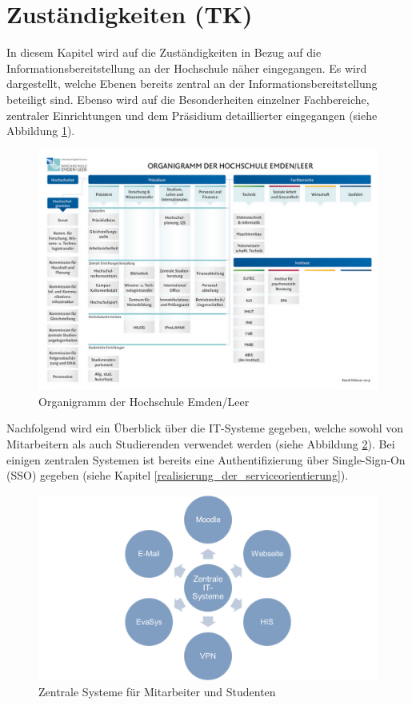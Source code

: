 \section{Zuständigkeiten (TK)}
\label{section_zustaendigkeiten}
In diesem Kapitel wird auf die Zuständigkeiten in Bezug auf die Informationsbereitstellung an der Hochschule näher eingegangen. Es wird dargestellt, welche Ebenen bereits zentral an der Informationsbereitstellung beteiligt sind. Ebenso wird auf die Besonderheiten einzelner Fachbereiche, zentraler Einrichtungen und dem Präsidium detaillierter eingegangen (siehe Abbildung \ref{fig_organigramm_HS}). 

\begin{figure}[h!]
	\centering
	\includegraphics[width=14cm]{kapitel/gruppe2/bilder/organigramm_HS}
	\caption{Organigramm der Hochschule Emden/Leer}
	\label{fig_organigramm_HS}
\end{figure}

Nachfolgend wird ein Überblick über die IT-Systeme gegeben, welche sowohl von Mitarbeitern als auch Studierenden verwendet werden (siehe Abbildung  \ref{fig_zentrale_systeme}). Bei einigen zentralen Systemen ist bereits eine Authentifizierung über Single-Sign-On (SSO) gegeben (siehe Kapitel \ref{realisierung_der_serviceorientierung}).

\begin{figure}[h!]
	\centering
	\includegraphics[width=14cm]{kapitel/gruppe2/bilder/zentrale_systeme}
	\caption{Zentrale Systeme für Mitarbeiter und Studenten}
	\label{fig_zentrale_systeme}
\end{figure}


